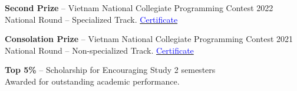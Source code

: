 \documentclass[10pt]{article}
\begin{document}
\textbf{Second Prize} -- Vietnam National Collegiate Programming Contest \hfill 2022 \\
National Round -- Specialized Track. \hfill \href{https://github.com/taitruong256/Competitive-programming/blob/main/Bang-khen-giai-Nhi-Olympic-Tin-hoc-Sinh-vien-Viet-Nam-2022-khoi-Chuyen-tin.jpg}{\textcolor{blue}{Certificate}}

\textbf{Consolation Prize} -- Vietnam National Collegiate Programming Contest \hfill 2021 \\
National Round -- Non-specialized Track. \hfill \href{https://github.com/taitruong256/Competitive-programming/blob/main/Chung-nhan-giai-Khuyen-khich-Olympic-Tin-hoc-Sinh-vien-Viet-Nam-2021-khoi-Khong-chuyen-tin.jpg}{\textcolor{blue}{Certificate}}

\textbf{Top 5\%} -- Scholarship for Encouraging Study \hfill 2 semesters \\
Awarded for outstanding academic performance.
\end{document}
